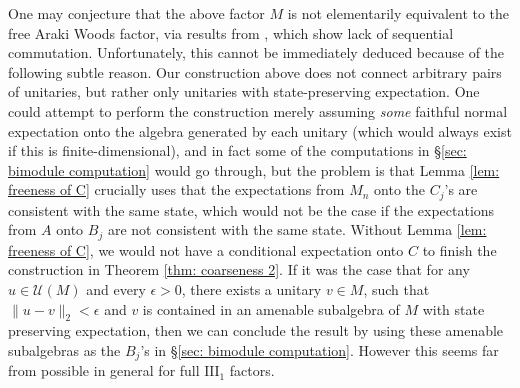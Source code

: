 \documentclass[10pt]{amsart}
\numberwithin{equation}{section}
\theoremstyle{definition}
\begin{document}
One may conjecture that the above factor $M$ is not elementarily equivalent to the free Araki Woods factor, via results from \cite{hayes2024generalsolidityphenomenaanticoarse}, which show lack of sequential commutation. Unfortunately, this cannot be immediately deduced because of the following subtle reason. Our construction above does not connect arbitrary pairs of unitaries, but rather only unitaries with state-preserving expectation.  One could attempt to perform the construction merely assuming \emph{some} faithful normal expectation onto the algebra generated by each unitary (which would always exist if this is finite-dimensional), and in fact some of the computations in \S \ref{sec: bimodule computation} would go through, but the problem is that Lemma \ref{lem: freeness of C} crucially uses that the expectations from $M_n$ onto the $C_j$'s are consistent with the same state, which would not be the case if the expectations from $A$ onto $B_j$ are not consistent with the same state.  Without Lemma \ref{lem: freeness of C}, we would not have a conditional expectation onto $C$ to finish the construction in Theorem \ref{thm: coarseness 2}. If it was the case that for any $u\in \mathcal{U}(M)$ and every $\epsilon>0$, there exists a unitary $v\in M$, such that $\|u-v\|_2<\epsilon$ and $v$ is contained in an amenable subalgebra of $M$ with state preserving expectation, then we can conclude the result by using these amenable subalgebras as the $B_j$'s in \S \ref{sec: bimodule computation}. However this seems far from possible in general for full $\mathrm{III}_1$ factors.
  



\end{document}
